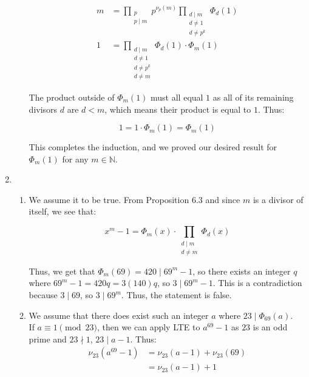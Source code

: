 \documentclass{article}
\begin{document}
\begin{enumerate}
\begin{enumerate}
    \begin{align*}
    m &= \prod_{\substack{p\\p\mid m}} p^{\nu_p(m)} \prod_{\substack{d \mid m \\ d \neq 1 \\ d \neq p^k }} \Phi_d(1) \\
    1 &= \prod_{\substack{d \mid m \\ d \neq 1 \\ d \neq p^k \\d \neq m }} \Phi_d(1) \cdot \Phi_m(1)
    \end{align*}


    The product outside of $\Phi_m(1)$ must all equal $1$ as all of its remaining divisors $d$ are $d < m$, which means their product is equal to $1$. Thus: 

    $$1 = 1 \cdot \Phi_m(1) = \Phi_m(1)$$

    This completes the induction, and we proved our desired result for $\Phi_m(1)$ for any $m \in \mathbb{N}$.
\end{enumerate}

\newpage

\item 
    \begin{enumerate}
    \item
    We assume it to be true. From Proposition 6.3 and since $m$ is a divisor of itself, we see that: 

    $$x^m - 1 = \Phi_m(x) \cdot \prod_{\substack{d \mid m \\ d \neq m}} \Phi_d(x)$$
    
    Thus, we get that $\Phi_m(69) = 420 \mid 69^m - 1$, so there exists an integer $q$ where $69^m -1 = 420q = 3(140)q$, so $3 \mid 69^m - 1$. This is a contradiction because $3 \mid 69$, so $3 \mid 69^m$. Thus, the statement is false. \\ 

    \item 
    We assume that there does exist such an integer $a$ where $23 \mid \Phi_{69}(a)$. \\
    
    If $a \equiv 1 \pmod{23}$, then we can apply LTE to $a^{69} - 1$ as $23$ is an odd prime and $23 \nmid 1$, $23 \mid a - 1$. Thus:
    \begin{align*}
    \nu_{23}(a^{69} - 1) &= \nu_{23}(a- 1) +\nu_{23}(69) \\
    &= \nu_{23}(a- 1) + 1
    \end{align*} 


\end{enumerate}
\end{enumerate}
\end{document}

